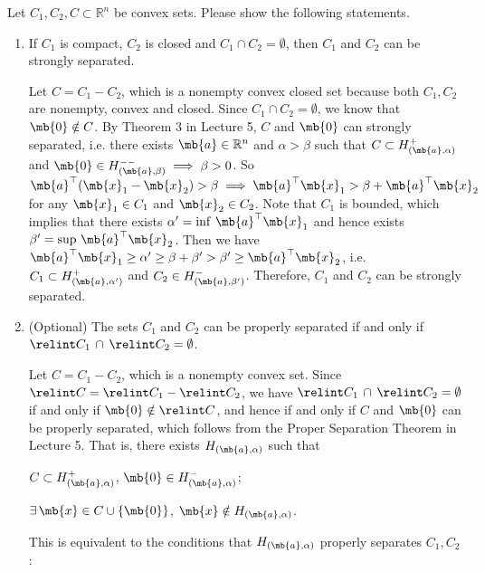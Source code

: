 \begin{exercise}
  Let $C_1, C_2,C\subset\mathbb{R}^n$ be convex sets. Please show the following statements.
  \begin{enumerate}
    \item
      If $C_1$ is compact, $C_2$ is closed and $C_1\cap C_2=\emptyset$, then $C_1$ and $C_2$ can be strongly separated.
      \begin{solution}
        Let $C=C_1-C_2$, which is a nonempty convex closed set because both $C_1, C_2$ are nonempty, convex and closed. Since $C_1\cap C_2=\emptyset$, we know that $\mb{0} \notin C$. By Theorem 3 in Lecture 5, $C$ and $\mb{0}$ can strongly separated, i.e. there exists $\mb{a}\in \mathbb{R}^n$ and $\alpha>\beta$ such that $C \subset H^+_{(\mb{a},\alpha)}$ and $\mb{0} \in H^{--}_{(\mb{a},\beta)} \implies \beta > 0$. So $\mb{a}^\top (\mb{x}_1 - \mb{x}_2) > \beta \implies \mb{a}^\top \mb{x}_1 > \beta + \mb{a}^\top \mb{x}_2$ for any $\mb{x}_1 \in C_1$ and $\mb{x}_2 \in C_2$. Note that $C_1$ is bounded, which implies that there exists $\alpha' = \inf\, \mb{a}^\top \mb{x}_1$ and hence exists $\beta' = \sup\, \mb{a}^\top \mb{x}_2$. Then we have $\mb{a}^\top \mb{x}_1 \ge \alpha' \ge \beta + \beta' > \beta' \ge \mb{a}^\top\mb{x}_2$, i.e. $C_1 \subset H^+_{(\mb{a},\alpha')}$ and $C_2 \in H^-_{(\mb{a},\beta')}$. Therefore, $C_1$ and $C_2$ can be strongly separated.
        \qedhere
      \end{solution}
    \item (Optional)
      The sets $C_1$ and $C_2$ can be properly separated if and only if $\relint C_1\,\cap\,\relint C_2=\emptyset$.
      \begin{solution}
        Let $C=C_1-C_2$, which is a nonempty convex set. Since $\relint C = \relint C_1 - \relint C_2$, we have $\relint C_1\,\cap\,\relint C_2=\emptyset$ if and only if $\mb{0} \notin \relint C$, and hence if and only if $C$ and $\mb{0}$ can be properly separated, which follows from the Proper Separation Theorem in Lecture 5. That is, there exists $H_{(\mb{a},\alpha)}$ such that 
        \begin{center}
          $C \subset H^+_{(\mb{a},\alpha)}$, $\mb{0} \in H^-_{(\mb{a},\alpha)}$;\par
          $\exists\, \mb{x} \in C \cup \{\mb{0}\}$, $\mb{x} \notin H_{(\mb{a},\alpha)}$. 
        \end{center}
        This is equivalent to the conditions that $H_{(\mb{a},\alpha)}$ properly separates $C_1, C_2$:
        \begin{center}

\end{center}
\end{solution}
\end{enumerate}
\end{exercise}
